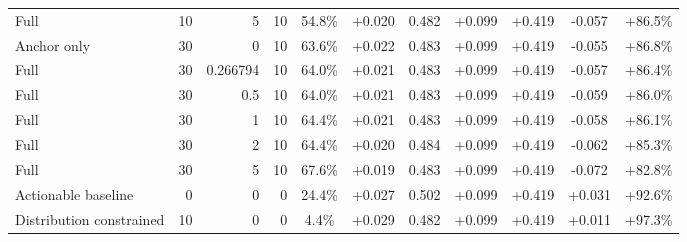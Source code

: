 \begin{table}[htbp]
\begin{tabular}{lrrrccccccc}
Full & 10 & 5 & 10 & 54.8\% & +0.020 & 0.482 & +0.099 & +0.419 & -0.057 & +86.5\% \\
Anchor only & 30 & 0 & 10 & 63.6\% & +0.022 & 0.483 & +0.099 & +0.419 & -0.055 & +86.8\% \\
Full & 30 & 0.266794 & 10 & 64.0\% & +0.021 & 0.483 & +0.099 & +0.419 & -0.057 & +86.4\% \\
Full & 30 & 0.5 & 10 & 64.0\% & +0.021 & 0.483 & +0.099 & +0.419 & -0.059 & +86.0\% \\
Full & 30 & 1 & 10 & 64.4\% & +0.021 & 0.483 & +0.099 & +0.419 & -0.058 & +86.1\% \\
Full & 30 & 2 & 10 & 64.4\% & +0.020 & 0.484 & +0.099 & +0.419 & -0.062 & +85.3\% \\
Full & 30 & 5 & 10 & 67.6\% & +0.019 & 0.483 & +0.099 & +0.419 & -0.072 & +82.8\% \\
Actionable baseline & 0 & 0 & 0 & 24.4\% & +0.027 & 0.502 & +0.099 & +0.419 & +0.031 & +92.6\% \\
Distribution constrained & 10 & 0 & 0 & 4.4\% & +0.029 & 0.482 & +0.099 & +0.419 & +0.011 & +97.3\% \\
\bottomrule
\end{tabular}
\end{table}